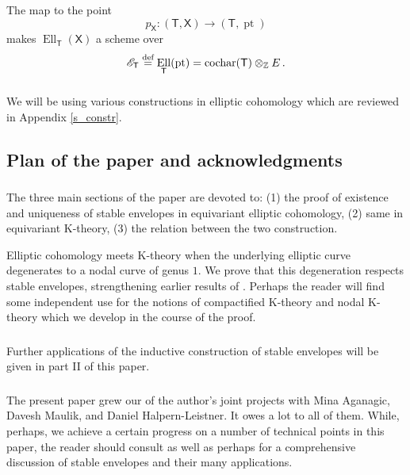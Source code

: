 \documentclass[14pt]{extarticle}
\newcommand{\Z}{\mathbb{Z}}
\newcommand{\bT}{\mathsf{T}}
\newcommand{\bX}{\mathsf{X}}
\newcommand{\cE}{\mathscr{E}}
\DeclareMathOperator{\Ell}{Ell}
\DeclareMathOperator{\pt}{pt}
\DeclareMathOperator{\cochar}{cochar}
\theoremstyle{definition}
\begin{document}
\subsubsection{}
The map to the point
%
\begin{equation}
p_\bX: (\bT,\bX) \to (\bT, \pt) \label{p_X}
\end{equation}
%
makes $\Ell_\bT(\bX)$ a scheme over 
%
\begin{equation}
\cE_\bT \overset{\tiny\textup{def}} = \Ell_\bT(\pt) =
\cochar(\bT) \otimes_\Z E\,. \label{cEbT}
\end{equation}
%

\subsubsection{}

We will be using various constructions in elliptic cohomology which
are reviewed in Appendix \ref{s_constr}. 





\subsection{Plan of the paper and acknowledgments}

\subsubsection{}
The three main sections of the paper are devoted to: (1) the proof of
existence and uniqueness of stable envelopes in equivariant elliptic
cohomology, (2) same in equivariant K-theory, (3) the relation between
the two construction.

Elliptic cohomology meets K-theory when the underlying elliptic curve
degenerates to a nodal curve of genus $1$. We prove that this
degeneration respects stable envelopes, strengthening earlier results of
\cite{ese,KonSmi}. Perhaps the reader will find some independent use for the notions of compactified
K-theory and nodal K-theory which we develop in the course of the
proof.

\subsubsection{}
Further applications of the inductive construction of stable envelopes
will be given in part II of this paper.

\subsubsection{}
The present paper grew our of the author's joint projects \cite{ese, DHLMO} with Mina
Aganagic, Davesh Maulik, and Daniel Halpern-Leistner. It owes a lot to
all of them. While, perhaps, we achieve a certain progress on a number
of technical points in this paper, the reader should consult
\cite{ese, DHLMO} as well as perhaps \cite{MO1, Opcmi, AO2} for a
comprehensive discussion of stable envelopes and their many
applications.
\end{document}
